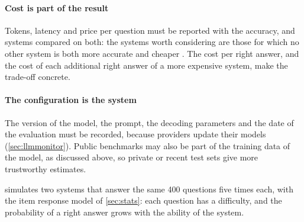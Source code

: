 \paragraph{Cost is part of the result} Tokens, latency and price per question must be reported
with the accuracy, and systems compared on both: the systems worth considering are those for which
no other system is both more accurate and cheaper \citep{kapoor2025agents}. The cost per right
answer, and the cost of each additional right answer of a more expensive system, make the
trade-off concrete.

\paragraph{The configuration is the system} The version of the model, the prompt, the decoding
parameters and the date of the evaluation must be recorded, because providers update their models
(\cref{sec:llmmonitor}). Public benchmarks may also be part of the training data of the model, as
discussed above, so private or recent test sets give more trustworthy estimates.

 simulates two systems that answer the same 400 questions five times each,
with the item response model of \cref{sec:stats}: each question has a difficulty, and the
probability of a right answer grows with the ability of the system.

